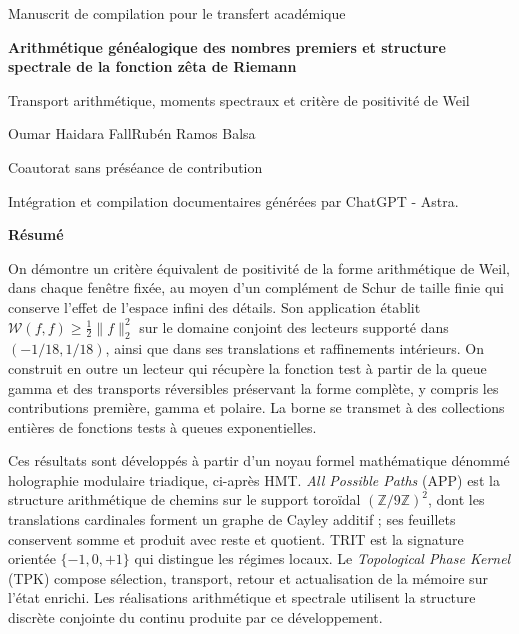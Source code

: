 \thispagestyle{plain}
\begin{center}
{\fontsize{10}{12}\selectfont Manuscrit de compilation pour le transfert académique\par}
\vspace{6mm}
{\fontsize{17}{20.5}\selectfont\bfseries Arithmétique généalogique des nombres premiers et structure spectrale de la fonction zêta de Riemann\par}
\vspace{7pt}
{\fontsize{12}{14.5}\selectfont Transport arithmétique, moments spectraux et critère de positivité de Weil\par}
\vspace{8pt}
{\fontsize{11.5}{14}\selectfont Oumar Haidara Fall\space\textperiodcentered\space Rubén Ramos Balsa\par}
\vspace{4pt}
{\fontsize{8}{10}\selectfont Coautorat sans préséance de contribution\par}
\vspace{4pt}
{\fontsize{8}{10}\selectfont Intégration et compilation documentaires générées par ChatGPT - Astra.\par}
\end{center}
\vspace{3pt}
{}
\begin{center}\bfseries Résumé\end{center}
\begingroup\fontsize{10.5}{12.8}\selectfont
On démontre un critère équivalent de positivité de la forme arithmétique de Weil, dans chaque fenêtre fixée, au moyen d'un complément de Schur de taille finie qui conserve l'effet de l'espace infini des détails. Son application établit $\mathscr W(f,f)\geq\frac12\|f\|_2^2$ sur le domaine conjoint des lecteurs supporté dans $(-1/18,1/18)$, ainsi que dans ses translations et raffinements intérieurs. On construit en outre un lecteur qui récupère la fonction test à partir de la queue gamma et des transports réversibles préservant la forme complète, y compris les contributions première, gamma et polaire. La borne se transmet à des collections entières de fonctions tests à queues exponentielles.

Ces résultats sont développés à partir d’un noyau formel mathématique
dénommé holographie modulaire triadique, ci-après HMT.
\emph{All Possible Paths} (APP) est la structure arithmétique de
chemins sur le support toroïdal $(\mathbb Z/9\mathbb Z)^2$,
dont les translations cardinales forment un graphe de Cayley additif ;
ses feuillets conservent somme et produit avec reste et quotient. TRIT est
la signature orientée $\{-1,0,+1\}$ qui distingue les régimes
locaux. Le \emph{Topological Phase Kernel} (TPK) compose
sélection, transport, retour et actualisation de la mémoire sur
l’état enrichi. Les réalisations arithmétique et spectrale
utilisent la structure discrète conjointe du continu produite
par ce développement.

